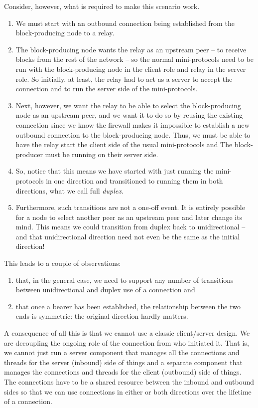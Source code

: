 Consider, however, what is required to make this scenario work.
\begin{enumerate}
\item We must start with an outbound connection being established from the
      block-producing node to a relay.
\item The block-producing node wants the relay as an upstream peer -- to
      receive blocks from the rest of the network -- so the normal
      mini-protocols need to be run with the block-producing node in the client
      role and relay in the server role. So initially, at least, the relay had to
      act as a server to accept the connection and to run the server side of
      the mini-protocols.
\item Next, however, we want the relay to be able to select the block-producing
      node as an upstream peer, and we want it to do so by reusing the existing
      connection since we know the firewall makes it impossible to establish a
      new outbound connection to the block-producing node. Thus, we must be able
      to have the relay start the client side of the usual mini-protocols and
      The block-producer must be running on their server side.
\item So, notice that this means we have started with just running the
      mini-protocols in one direction and transitioned to running them in both
      directions, what we call full \emph{duplex}.
\item Furthermore, such transitions are not a one-off event. It is entirely
      possible for a node to select another peer as an upstream peer and later
      change its mind. This means we could transition from duplex back to
      unidirectional -- and that unidirectional direction need not even be the
      same as the initial direction!
\end{enumerate}
This leads to a couple of observations:
\begin{enumerate}
\item that, in the general case, we need to support any number of transitions
      between unidirectional and duplex use of a connection and
\item that once a bearer has been established, the relationship between the two
      ends is symmetric: the original direction hardly matters.
\end{enumerate}

A consequence of all this is that we cannot use a classic client/server design.
We are decoupling the ongoing role of the connection from who initiated it.
That is, we cannot just run a server component that manages all the connections
and threads for the server (inbound) side of things and a separate component
that manages the connections and threads for the client (outbound) side of
things. The connections have to be a shared resource between the inbound and
outbound sides so that we can use connections in either or both directions
over the lifetime of a connection.

